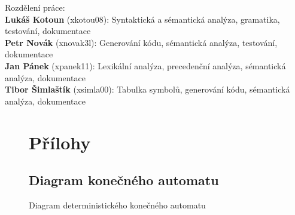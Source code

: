 \documentclass[11spt]{article}
\begin{document}
Rozdělení práce: \\[1em]
\textbf{Lukáš Kotoun} (xkotou08): Syntaktická a sémantická analýza, gramatika, testování, dokumentace \\
\textbf{Petr Novák} (xnovak3l): Generování kódu, sémantická analýza, testování, dokumentace \\
\textbf{Jan Pánek} (xpanek11): Lexikální analýza, precedenční analýza, sémantická analýza, dokumentace \\
\textbf{Tibor Šimlaštík} (xsimla00): Tabulka symbolů, generování kódu, sémantická analýza, dokumentace\\





\begin{landscape}
    \thispagestyle{empty}
    \begin{figure}[!h]
        \section{Přílohy}
        \subsection{Diagram konečného automatu}
        \begin{center}
        \caption{Diagram deterministického konečného automatu}
        \label{fig:fsm}
        \end{center}
    \end{figure}
\end{landscape}
\restoregeometry
\end{document}
